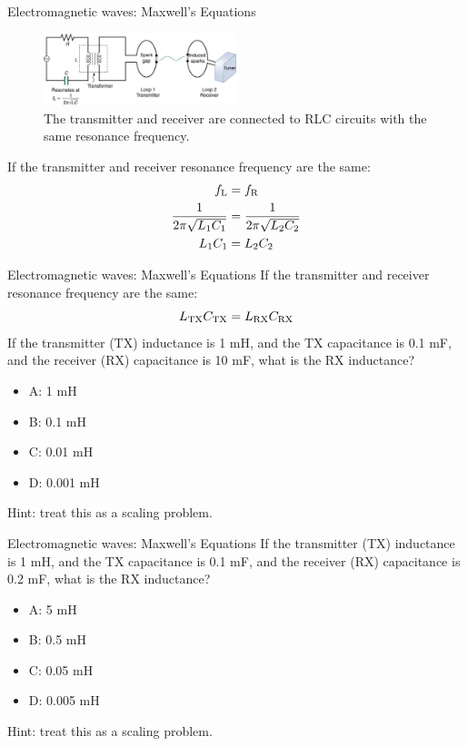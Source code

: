 \documentclass{beamer}
\begin{document}
\begin{frame}{Electromagnetic waves: Maxwell's Equations}
\begin{figure}
\centering
\includegraphics[width=0.5\textwidth]{figures/spark.png}
\caption{\label{fig:spark2} The transmitter and receiver are connected to RLC circuits with the same resonance frequency.}
\end{figure}
If the transmitter and receiver resonance frequency are the same:
\begin{align}
f_{\rm L} &= f_{\rm R} \\
\frac{1}{2\pi \sqrt{L_1 C_1}} &= \frac{1}{2\pi \sqrt{L_2 C_2}} \\
L_1 C_1 &= L_2 C_2 
\end{align}
\end{frame}

\begin{frame}{Electromagnetic waves: Maxwell's Equations}
If the transmitter and receiver resonance frequency are the same:
\begin{equation}
L_{\rm TX} C_{\rm TX} = L_{\rm RX} C_{\rm RX}
\end{equation}
If the transmitter (TX) inductance is 1 mH, and the TX capacitance is 0.1 mF, and the receiver (RX) capacitance is 10 mF, what is the RX inductance?
\begin{itemize}
\item A: 1 mH
\item B: 0.1 mH
\item C: 0.01 mH
\item D: 0.001 mH
\end{itemize}
\footnotesize
Hint: treat this as a scaling problem.
\end{frame}

\begin{frame}{Electromagnetic waves: Maxwell's Equations}
If the transmitter (TX) inductance is 1 mH, and the TX capacitance is 0.1 mF, and the receiver (RX) capacitance is 0.2 mF, what is the RX inductance?
\begin{itemize}
\item A: 5 mH
\item B: 0.5 mH
\item C: 0.05 mH
\item D: 0.005 mH
\end{itemize}
\footnotesize
Hint: treat this as a scaling problem.
\end{frame}
\end{document}
